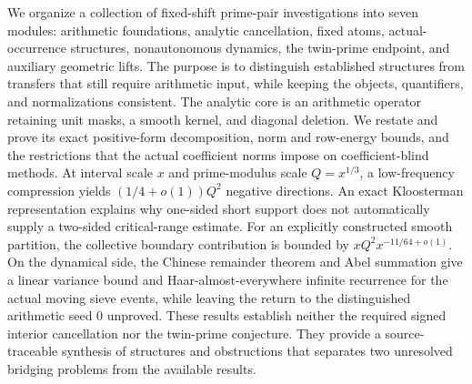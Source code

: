 We organize a collection of fixed-shift prime-pair investigations into seven modules: arithmetic foundations, analytic cancellation, fixed atoms, actual-occurrence structures, nonautonomous dynamics, the twin-prime endpoint, and auxiliary geometric lifts. The purpose is to distinguish established structures from transfers that still require arithmetic input, while keeping the objects, quantifiers, and normalizations consistent. The analytic core is an arithmetic operator retaining unit masks, a smooth kernel, and diagonal deletion. We restate and prove its exact positive-form decomposition, norm and row-energy bounds, and the restrictions that the actual coefficient norms impose on coefficient-blind methods. At interval scale $x$ and prime-modulus scale $Q=x^{1/3}$, a low-frequency compression yields $(1/4+o(1))Q^2$ negative directions. An exact Kloosterman representation explains why one-sided short support does not automatically supply a two-sided critical-range estimate. For an explicitly constructed smooth partition, the collective boundary contribution is bounded by $xQ^2x^{-11/64+o(1)}$. On the dynamical side, the Chinese remainder theorem and Abel summation give a linear variance bound and Haar-almost-everywhere infinite recurrence for the actual moving sieve events, while leaving the return to the distinguished arithmetic seed $0$ unproved. These results establish neither the required signed interior cancellation nor the twin-prime conjecture. They provide a source-traceable synthesis of structures and obstructions that separates two unresolved bridging problems from the available results.
